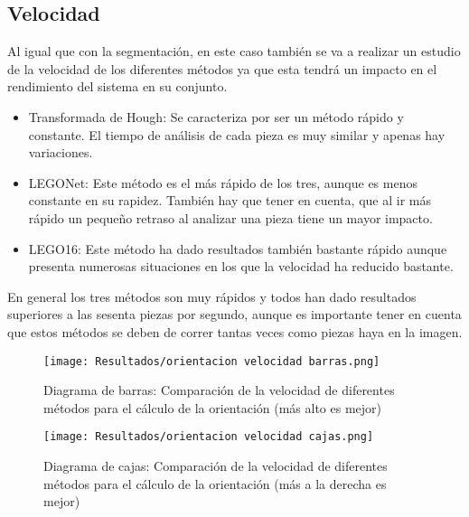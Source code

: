 \newpage
\subsection{Velocidad}
Al igual que con la segmentación, en este caso también se va a realizar un estudio de la velocidad de los diferentes métodos ya que esta tendrá un impacto en el rendimiento del sistema en su conjunto.

\begin{itemize}
\item Transformada de Hough: Se caracteriza por ser un método rápido y constante. El tiempo de análisis de cada pieza es muy similar y apenas hay variaciones.
\item LEGONet: Este método es el más rápido de los tres, aunque es menos constante en su rapidez. También hay que tener en cuenta, que al ir más rápido un pequeño retraso al analizar una pieza tiene un mayor impacto.
\item LEGO16: Este método ha dado resultados también bastante rápido aunque presenta numerosas situaciones en los que la velocidad ha reducido bastante.
\end{itemize}

En general los tres métodos son muy rápidos y todos han dado resultados superiores a las sesenta piezas por segundo, aunque es importante tener en cuenta que estos métodos se deben de correr tantas veces como piezas haya en la imagen.

\begin{figure}[ht]  %
\vspace{-10pt}
	\centering
	\texttt{[image: Resultados/orientacion velocidad barras.png]}
	\caption{Diagrama de barras: Comparación de la velocidad de diferentes métodos para el cálculo de la orientación (más alto es mejor)}
	\label{fig:orientacion velocidad barras}
\end{figure}

\begin{figure}[ht]  %
\vspace{-10pt}
	\centering
	\texttt{[image: Resultados/orientacion velocidad cajas.png]}
	\caption{Diagrama de cajas: Comparación de la velocidad de diferentes métodos para el cálculo de la orientación (más a la derecha es mejor)}
	\label{fig:orientacion velocidad cajas}
\end{figure}